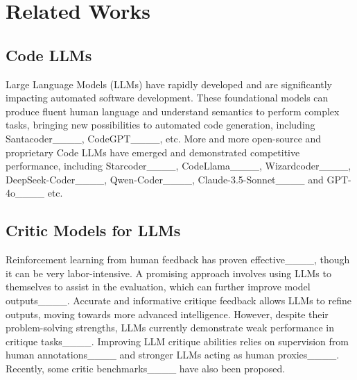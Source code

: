 \section{Related Works}
\subsection{Code LLMs} 

Large Language Models (LLMs) have rapidly developed and are significantly impacting automated software development. These foundational models can produce fluent human language and understand semantics to perform complex tasks, bringing new possibilities to automated code generation, including Santacoder____, CodeGPT____, etc. More and more open-source and proprietary Code LLMs have emerged and demonstrated competitive performance, including Starcoder____, CodeLlama____, Wizardcoder____, DeepSeek-Coder____, Qwen-Coder____, Claude-3.5-Sonnet____ and GPT-4o____ etc. 

\subsection{Critic Models for LLMs}

Reinforcement learning from human feedback has proven effective____, though it can be very labor-intensive. A promising approach involves using LLMs to themselves to assist in the evaluation, which can further improve model outputs____. Accurate and informative critique feedback allows LLMs to refine outputs, moving towards more advanced intelligence. However, despite their problem-solving strengths, LLMs currently demonstrate weak performance in critique tasks____. Improving LLM critique abilities relies on supervision from human annotations____ and stronger LLMs acting as human proxies____.
Recently, some critic benchmarks____ have also been proposed.